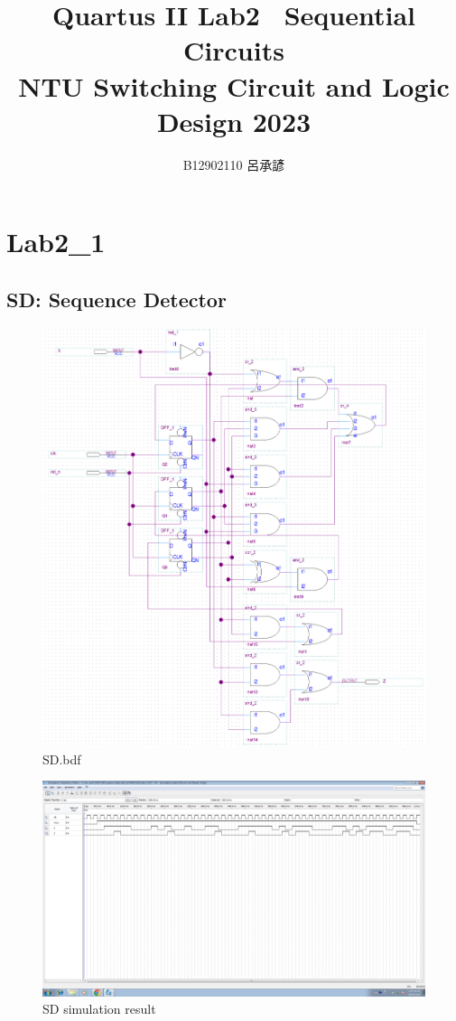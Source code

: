 \documentclass[12pt,a4paper]{article}
\title{
  Quartus II Lab2 \textemdash\ Sequential Circuits\\
  \large NTU Switching Circuit and Logic Design 2023
}
\author{B12902110 呂承諺}
\date{}
\begin{document}
  \maketitle
  \section{Lab2\_1}
  \subsection{SD: Sequence Detector}
  \begin{figure}[H]
    \centering
    \includegraphics[width=0.93\linewidth]{Lab2_1/SD_bdf.png}
    \caption{SD.bdf}
  \end{figure}
  \begin{figure}[H]
    \centering
    \includegraphics[width=\linewidth]{Lab2_1/SD_simulation.png}
    \caption{SD simulation result}
  \end{figure}
\end{document}
